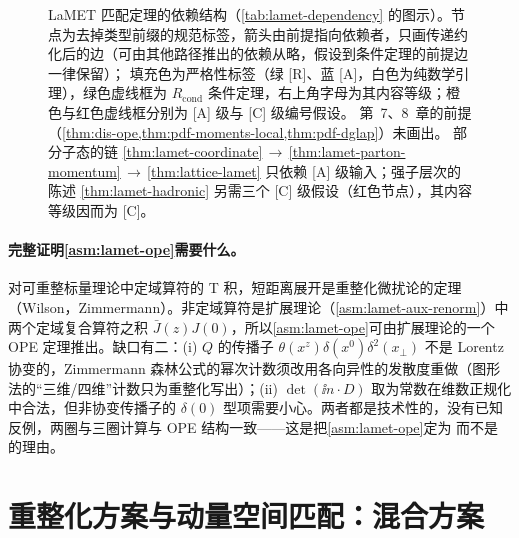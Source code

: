 \begin{figure}[htbp]
\caption{LaMET 匹配定理的依赖结构（\cref{tab:lamet-dependency} 的图示）。节点为去掉类型前缀的规范标签，箭头由前提指向依赖者，只画传递约化后的边（可由其他路径推出的依赖从略，假设到条件定理的前提边一律保留）；
填充色为严格性标签（绿 [R]、蓝 [A]，白色为纯数学引理），绿色虚线框为 $R_{\mathrm{cond}}$ 条件定理，右上角字母为其内容等级；橙色与红色虚线框分别为 [A] 级与 [C] 级编号假设。
第~7、8~章的前提（\cref{thm:dis-ope,thm:pdf-moments-local,thm:pdf-dglap}）未画出。
部分子态的链 \cref{thm:lamet-coordinate}$\,\to\,$\cref{thm:lamet-parton-momentum}$\,\to\,$\cref{thm:lattice-lamet} 只依赖 [A] 级输入；强子层次的陈述 \cref{thm:lamet-hadronic} 另需三个 [C] 级假设（红色节点），其内容等级因而为 [C]。}
\label{fig:lamet-dependency}
\end{figure}
\paragraph{完整证明\cref{asm:lamet-ope}需要什么。}
对可重整标量理论中定域算符的 T 积，短距离展开是重整化微扰论的定理（Wilson\cite{Wilson1969}，Zimmermann\cite{Zimmermann1973}）。非定域算符是扩展理论（\cref{asm:lamet-aux-renorm}）中两个定域复合算符之积 $\bar J(z)J(0)$，所以\cref{asm:lamet-ope}可由扩展理论的一个 OPE 定理推出。缺口有二：(i) $Q$ 的传播子 $\theta(x^z)\delta(x^0)\delta^2(x_\perp)$ 不是 Lorentz 协变的，Zimmermann 森林公式的幂次计数须改用各向异性的发散度重做（图形法的“三维/四维”计数只为重整化写出）；(ii) $\det(\ii n\cdot D)$ 取为常数在维数正规化中合法，但非协变传播子的 $\delta(0)$ 型项需要小心。两者都是技术性的，没有已知反例，两圈与三圈计算与 OPE 结构一致——这是把\cref{asm:lamet-ope}定为 \tagA 而不是 \tagC 的理由。

\section{重整化方案与动量空间匹配：混合方案}\label{sec:lamet-schemes}

